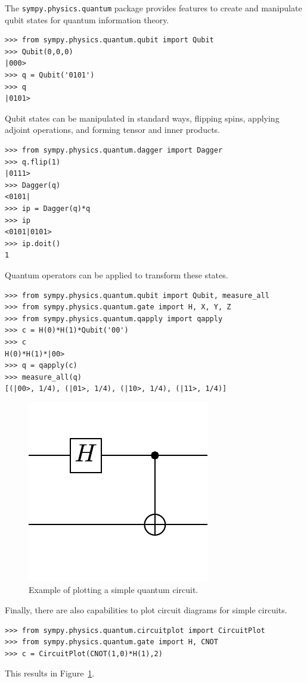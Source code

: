 The \verb|sympy.physics.quantum| package provides features to create and manipulate qubit states for quantum information theory.
\begin{verbatim}
>>> from sympy.physics.quantum.qubit import Qubit
>>> Qubit(0,0,0)
|000>
>>> q = Qubit('0101')
>>> q
|0101>

\end{verbatim}
Qubit states can be manipulated in standard ways, flipping spins, applying adjoint operations, and forming tensor and inner products.
\begin{verbatim}
>>> from sympy.physics.quantum.dagger import Dagger
>>> q.flip(1)
|0111>
>>> Dagger(q)
<0101|
>>> ip = Dagger(q)*q
>>> ip
<0101|0101>
>>> ip.doit()
1

\end{verbatim}
Quantum operators can be applied to transform these states.
\begin{verbatim}
>>> from sympy.physics.quantum.qubit import Qubit, measure_all
>>> from sympy.physics.quantum.gate import H, X, Y, Z
>>> from sympy.physics.quantum.qapply import qapply
>>> c = H(0)*H(1)*Qubit('00')
>>> c
H(0)*H(1)*|00>
>>> q = qapply(c)
>>> measure_all(q)
[(|00>, 1/4), (|01>, 1/4), (|10>, 1/4), (|11>, 1/4)]

\end{verbatim}

\begin{figure}[htbp]
\begin{center}
\includegraphics[scale=0.75]{images/circuitplot-example}
\caption{Example of plotting a simple quantum circuit.}
\label{fig-circuitplot-example}
\end{center}
\end{figure}

Finally, there are also capabilities to plot circuit diagrams for simple circuits.
\begin{verbatim}
>>> from sympy.physics.quantum.circuitplot import CircuitPlot
>>> from sympy.physics.quantum.gate import H, CNOT
>>> c = CircuitPlot(CNOT(1,0)*H(1),2)

\end{verbatim}
This results in Figure~\ref{fig-circuitplot-example}.
